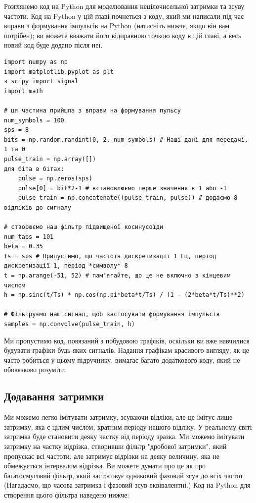 Розглянемо код на Python для моделювання нецілочисельної затримки та
зсуву частоти. Код на Python у цій главі почнеться з коду, який ми
написали під час вправи з формування імпульсів на Python (натисніть
нижче, якщо він вам потрібен); ви можете вважати його відправною точкою
коду в цій главі, а весь новий код буде додано після неї.

\begin{Verbatim}[breaklines=true,breakanywhere=true,fontsize=\small]
import numpy as np
import matplotlib.pyplot as plt
з scipy import signal
import math

# ця частина прийшла з вправи на формування пульсу
num_symbols = 100
sps = 8
bits = np.random.randint(0, 2, num_symbols) # Наші дані для передачі, 1 та 0
pulse_train = np.array([])
для біта в бітах:
    pulse = np.zeros(sps)
    pulse[0] = bit*2-1 # встановлюємо перше значення в 1 або -1
    pulse_train = np.concatenate((pulse_train, pulse)) # додаємо 8 відліків до сигналу

# створюємо наш фільтр підвищеної косинусоїди
num_taps = 101
beta = 0.35
Ts = sps # Припустимо, що частота дискретизації 1 Гц, період дискретизації 1, період *символу* 8
t = np.arange(-51, 52) # пам'ятайте, що це не включно з кінцевим числом
h = np.sinc(t/Ts) * np.cos(np.pi*beta*t/Ts) / (1 - (2*beta*t/Ts)**2)

# Фільтруємо наш сигнал, щоб застосувати формування імпульсів
samples = np.convolve(pulse_train, h)
\end{Verbatim}

Ми пропустимо код, пов\textquotesingle язаний з побудовою графіків,
оскільки ви вже навчилися будувати графіки будь-яких сигналів. Надання
графікам красивого вигляду, як це часто робиться у цьому підручнику,
вимагає багато додаткового коду, який не обов\textquotesingle язково
розуміти.

\subsection{Додавання
затримки}\label{ux434ux43eux434ux430ux432ux430ux43dux43dux44f-ux437ux430ux442ux440ux438ux43cux43aux438}

Ми можемо легко імітувати затримку, зсуваючи відліки, але це імітує лише
затримку, яка є цілим числом, кратним періоду нашого відліку. У
реальному світі затримка буде становити деяку частку від періоду зразка.
Ми можемо імітувати затримку на частку відрізка, створивши фільтр
"дробової затримки", який пропускає всі частоти, але затримує відрізки
на деяку величину, яка не обмежується інтервалом відрізка. Ви можете
думати про це як про багатосмуговий фільтр, який застосовує однаковий
фазовий зсув до всіх частот. (Нагадаємо, що часова затримка і фазовий
зсув еквівалентні.) Код на Python для створення цього фільтра наведено
нижче:

